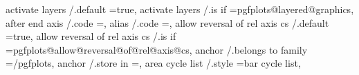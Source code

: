 activate layers                              /.default                                                                                 =true,                                                                                                              
activate layers                              /.is if                                                                                   =pgfplots@layered@graphics,                                                                                         
after end axis                               /.code                                                                                    =,                                                                                                                  
alias                                        /.code                                                                                    ={},       
allow reversal of rel axis cs                /.default                                                                                 =true,%
allow reversal of rel axis cs                /.is if                                                                                   =pgfplots@allow@reversal@of@rel@axis@cs,%
anchor                                       /.belongs to family                                                                       =/pgfplots,                                                                                                         
anchor                                       /.store in                                                                                =\pgfplots@anchorname,                                                                                              
area cycle list                              /.style                                                                                   ={bar cycle list},                                                                                                  
